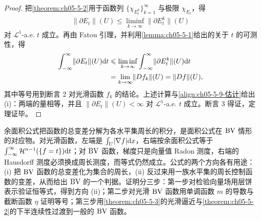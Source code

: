 \documentclass[../../main.tex]{subfiles}%
\begin{document}
\begin{proof}
把\cref{theorem:ch05-5-2}用于函数列 $\{\chi_{E_t^k}\}_{k=1}^{\infty}$ 与极限 $\chi_{E_t}$，得%
\begin{align*}
\lVert\partial E_t\rVert(U)\leqslant\liminf_{k\to\infty}\lVert\partial E_t^k\rVert(U)
\end{align*}
对 $\mathcal{L}^1$-a.e. $t$ 成立。再由 Fatou 引理，并利用\cref{lemma:ch05-5-1}给出的关于 $t$ 的可测性，得%
\begin{align*}
\int_{-\infty}^{\infty}\lVert\partial E_t\rVert(U)\mathrm{d} t
&\leqslant\liminf_{k\to\infty}\int_{-\infty}^{\infty}\lVert\partial E_t^k\rVert(U)\mathrm{d} t\\
&=\lim_{k\to\infty}\lVert Df_k\rVert(U)=\lVert Df\rVert(U),
\end{align*}
其中等号用到断言 2 对光滑函数 $f_k$ 的结论。上述计算与\eqref{align:ch05-5-9-估计}给出 (i)：两端的量相等，并且 $\lVert\partial E_t\rVert(U)<\infty$ 对 $\mathcal{L}^1$-a.e. $t$ 成立。断言 3 得证，定理证毕。
\end{proof}

\begin{remark}\label{remark:ch05-thm-5-9-动机}
余面积公式把函数的总变差分解为各水平集周长的积分，是面积公式在 $\mathrm{BV}$ 情形的对应物。对光滑函数，左端是 $\int_U\lvert\nabla f\rvert\mathrm{d} x$，右端按余面积公式等于 $\int_{-\infty}^{\infty}\mathcal{H}^{n-1}(\{f=t\})\mathrm{d} t$；对 $\mathrm{BV}$ 函数，梯度只是向量值 Radon 测度，右端的 Hausdorff 测度必须换成周长测度，而等式仍然成立。公式的两个方向各有用途：(i) 把 $\mathrm{BV}$ 函数的总变差化为集合的周长，(ii) 反过来用一族水平集的周长控制函数的变差，从而给出 $\mathrm{BV}$ 的一个判据。证明分三步：第一步对检验向量场用层饼表示验证恒等式，得到方向 (ii)；第二步对光滑 $\mathrm{BV}$ 函数用单调函数 $m$ 的导数与截断函数 $\eta$ 证明等号；第三步用\cref{theorem:ch05-5-3}的光滑逼近与\cref{theorem:ch05-5-2}的下半连续性过渡到一般的 $\mathrm{BV}$ 函数。%
\end{remark}
\end{document}
